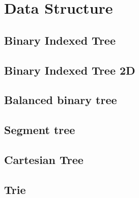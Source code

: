 \newpage
\section{Data Structure}

\subsection{Binary Indexed Tree}


\subsection{Binary Indexed Tree 2D}


\subsection{Balanced binary tree}

\subsection{Segment tree}


\subsection{Cartesian Tree}


\subsection{Trie}
